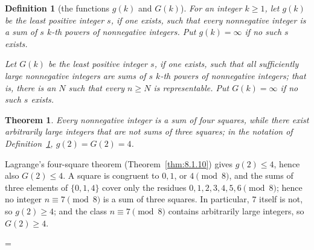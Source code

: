 \documentclass[11pt]{article}
\makeatletter
\theoremstyle{ntstyle}
\newtheorem{theorem}{Theorem}[subsection]
\newtheorem{definition}{Definition}[subsection]
\let\nt@closedisplay\]
\def\nt@guardedclose{\@ifnextchar\par{\nt@closeafterpar}{\@ifnextchar\end{\postdisplaypenalty\@M\nt@closedisplay}{\nt@closedisplay}}}
\def\nt@closeafterpar\par{\@ifnextchar\par{\nt@closeafterpar}{\@ifnextchar\end{\postdisplaypenalty\@M\nt@closedisplay\par}{\nt@closedisplay\par}}}
\renewenvironment{proof}[1][\proofname]{\par
  \pushQED{\qed}\normalfont\topsep\medskipamount\edef\nt@afterproof{\@endparpenalty=\the\@endparpenalty\relax}\@beginparpenalty\@M\@endparpenalty\@M\let\]\nt@guardedclose\trivlist\item[]\textit{#1\@addpunct{.}} \ignorespaces}{\ifvmode\addpenalty\@M\fi\popQED\nt@afterproof\endtrivlist\@endpefalse}
\makeatother
\begin{document}
\begin{definition}[the functions $g(k)$ and $G(k)$]
	\label{def:12.6.1} For an integer $k\ge1$,
	let $g(k)$ be the least positive integer $s$, if one exists, such that
	every nonnegative integer is a sum of $s$ $k$-th powers of
	nonnegative integers. Put $g(k)=\infty$ if no such $s$ exists.

	Let $G(k)$ be the least positive integer $s$, if one exists, such that
	all sufficiently large nonnegative integers are sums of $s$ $k$-th
	powers of nonnegative integers; that is, there is an $N$ such that every
	$n\ge N$ is representable. Put $G(k)=\infty$ if no such $s$ exists.

\end{definition}
\begin{theorem}\label{thm:12.6.1} Every nonnegative integer is a
	sum of four squares, while there exist arbitrarily large integers
	that are not sums of three squares; in the notation of Definition~\ref{def:12.6.1},
    \mbox{$g(2)=G(2)=4$}.

\end{theorem}

\begin{proof} Lagrange's four-square theorem (Theorem~\ref{thm:8.1.10}) gives $g(2)\le4$, hence also $G(2)\le4$. A square
	is congruent to $0, 1$, or $4\pmod{8}$, and the sums of three
	elements of $\{0, 1, 4\}$ cover only the residues $0, 1, 2, 3, 4, 5,
		6\pmod{8}$; hence no integer $n\equiv7\pmod{8}$ is a sum of three
	squares. In particular, $7$ itself is not, so $g(2)\ge4$; and the
	class $n\equiv7\pmod{8}$ contains arbitrarily large integers, so
	$G(2)\ge4$.

\end{proof}
\end{document}
